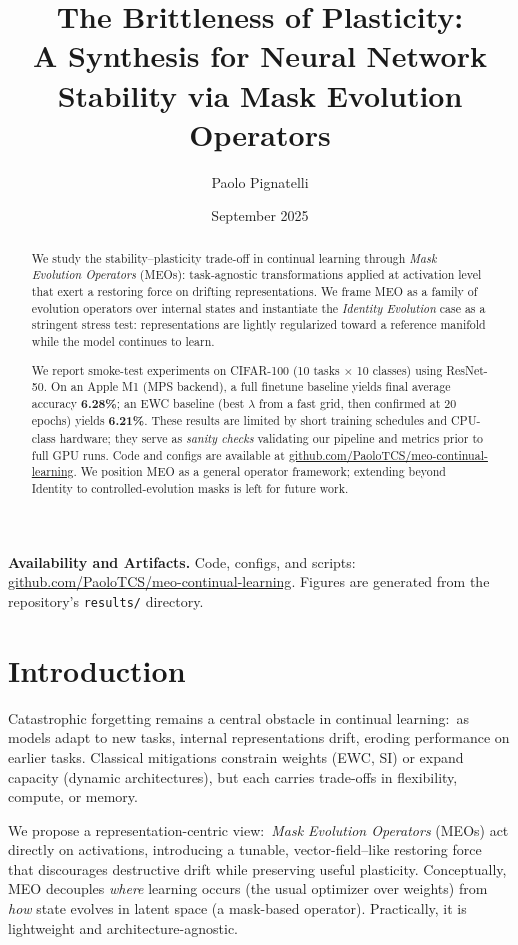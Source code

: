 \documentclass[11pt]{article}
\title{The Brittleness of Plasticity:\\
A Synthesis for Neural Network Stability via Mask Evolution Operators}
\author{Paolo Pignatelli}
\date{September 2025}
\newcommand{\EWC}{\textsc{EWC}}
\newcommand{\MEO}{\textsc{MEO}}
\begin{document}
\maketitle

\begin{abstract}
We study the stability--plasticity trade-off in continual learning through \emph{Mask Evolution Operators} (\MEO s): task-agnostic transformations applied at activation level that exert a restoring force on drifting representations. We frame \MEO{} as a family of evolution operators over internal states and instantiate the \emph{Identity Evolution} case as a stringent stress test: representations are lightly regularized toward a reference manifold while the model continues to learn. 

We report smoke-test experiments on CIFAR-100 (10 tasks $\times$ 10 classes) using ResNet-50. On an Apple M1 (MPS backend), a full finetune baseline yields final average accuracy \textbf{6.28\%}; an \EWC{} baseline (best $\lambda$ from a fast grid, then confirmed at 20 epochs) yields \textbf{6.21\%}. These results are limited by short training schedules and CPU-class hardware; they serve as \emph{sanity checks} validating our pipeline and metrics prior to full GPU runs. Code and configs are available at \href{https://github.com/PaoloTCS/meo-continual-learning}{github.com/PaoloTCS/meo-continual-learning}. We position \MEO{} as a general operator framework; extending beyond Identity to controlled-evolution masks is left for future work.
\end{abstract}

\vspace{0.5em}
\noindent\textbf{Availability and Artifacts.} Code, configs, and scripts: \href{https://github.com/PaoloTCS/meo-continual-learning}{github.com/PaoloTCS/meo-continual-learning}. Figures are generated from the repository’s \texttt{results/} directory.

\section{Introduction}
Catastrophic forgetting remains a central obstacle in continual learning:\ as models adapt to new tasks, internal representations drift, eroding performance on earlier tasks. Classical mitigations constrain weights (\EWC{}, SI) or expand capacity (dynamic architectures), but each carries trade-offs in flexibility, compute, or memory. 

We propose a representation-centric view:\ \emph{Mask Evolution Operators} (\MEO s) act directly on activations, introducing a tunable, vector-field--like restoring force that discourages destructive drift while preserving useful plasticity. Conceptually, \MEO{} decouples \emph{where} learning occurs (the usual optimizer over weights) from \emph{how} state evolves in latent space (a mask-based operator). Practically, it is lightweight and architecture-agnostic.
\end{document}
